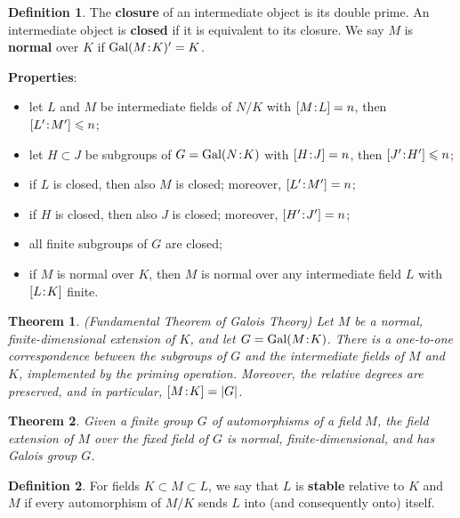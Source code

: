 \documentclass[11pt]{amsart}
\newtheorem*{theorem*}{Theorem}
\theoremstyle{definition}
\newtheorem*{definition*}{Definition}
\renewcommand\leq{\leqslant}
\renewcommand\:{\colon}
\newcommand{\1}{\mathds{1}}
\renewcommand{\d}[2]{[#1 \hspace{-.2em} : \hspace{-.2em} #2]}
\newcommand{\Gal}[2]{\text{Gal}(#1 \hspace{-.2em} : \hspace{-.2em} #2)}
\begin{document}
\begin{definition*}
	The \textbf{closure} of an intermediate object is its double prime. An intermediate object is \textbf{closed} if it is equivalent to its closure. We say $M$ is \textbf{normal} over $K$ if $\Gal MK' = K$.
\end{definition*}
\clearpage

\noindent \textbf{Properties}:
\begin{itemize}[leftmargin=*]\setlength\itemsep{0em}
	\item let $L$ and $M$ be intermediate fields of $N/K$ with $\d ML = n$, then $\d{L'}{M'} \leq n$;
	\item let $H \subset J$ be subgroups of $G = \Gal NK$ with $\d HJ = n$, then $\d{J'}{H'} \leq n$;
	\item if $L$ is closed, then also $M$ is closed; moreover, $\d{L'}{M'} = n$;
	\item if $H$ is closed, then also $J$ is closed; moreover, $\d{H'}{J'} = n$;
	\item all finite subgroups of $G$ are closed;
	\item if $M$ is normal over $K$, then $M$ is normal over any intermediate field $L$ with $\d LK$ finite.
\end{itemize}

\begin{theorem*}
	\textnormal{(Fundamental Theorem of Galois Theory)} Let $M$ be a normal, finite-dimensional extension of $K$, and let $G = \Gal MK$. There is a one-to-one correspondence between the subgroups of $G$ and the intermediate fields of $M$ and $K$, implemented by the priming operation. Moreover, the relative degrees are preserved, and in particular, $\d MK = |G|$.
\end{theorem*}

\begin{theorem*}
	Given a finite group $G$ of automorphisms of a field $M$, the field extension of $M$ over the fixed field of $G$ is normal, finite-dimensional, and has Galois group $G$.
\end{theorem*}
\vskip40pt

\begin{definition*}
	For fields $K \subset M \subset L$, we say that $L$ is \textbf{stable} relative to $K$ and $M$ if every automorphism of $M / K$ sends $L$ into (and consequently onto) itself.
\end{definition*}
\end{document}
